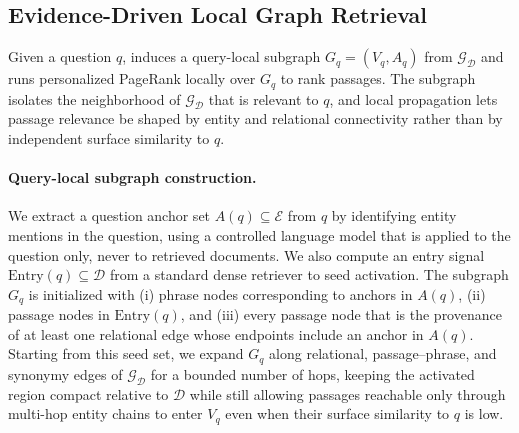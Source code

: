 \subsection{Evidence-Driven Local Graph Retrieval}
\label{sec:method:retrieval}

Given a question $q$, \methodname{} induces a query-local subgraph
$G_q = (V_q, A_q)$ from $\mathcal{G}_{\mathcal{D}}$ and runs personalized
PageRank locally over $G_q$ to rank passages. The subgraph isolates the
neighborhood of $\mathcal{G}_{\mathcal{D}}$ that is relevant to $q$, and
local propagation lets passage relevance be shaped by entity and
relational connectivity rather than by independent surface similarity to
$q$.

\paragraph{Query-local subgraph construction.}
We extract a question anchor set $A(q) \subseteq \mathcal{E}$ from $q$ by
identifying entity mentions in the question, using a controlled language
model that is applied to the question only, never to retrieved documents.
We also compute an entry signal $\mathrm{Entry}(q) \subseteq \mathcal{D}$
from a standard dense retriever to seed activation. The subgraph $G_q$ is
initialized with (i) phrase nodes corresponding to anchors in $A(q)$, (ii)
passage nodes in $\mathrm{Entry}(q)$, and (iii) every passage node that is
the provenance of at least one relational edge whose endpoints include an
anchor in $A(q)$. Starting from this seed set, we expand $G_q$ along
relational, passage--phrase, and synonymy edges of
$\mathcal{G}_{\mathcal{D}}$ for a bounded number of hops, keeping the
activated region compact relative to $\mathcal{D}$ while still allowing
passages reachable only through multi-hop entity chains to enter $V_q$
even when their surface similarity to $q$ is low.

